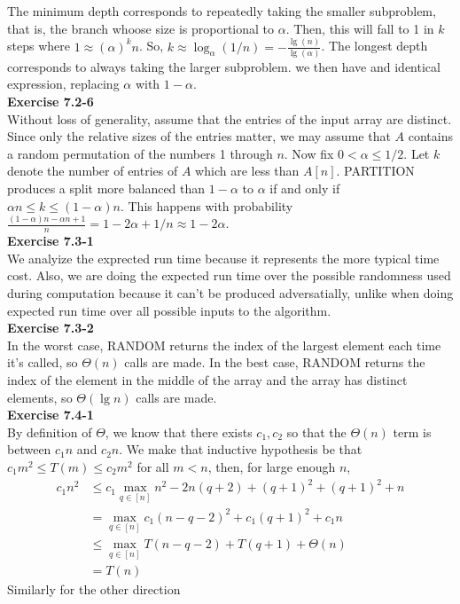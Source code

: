\documentclass{article}
\begin{document}
The minimum depth corresponds to repeatedly taking the smaller subproblem, that is, the branch whoose size is proportional to $\alpha$. Then, this will fall to 1 in $k$ steps where $1 \approx (\alpha)^k n$. So, $k \approx \log_{\alpha}(1/n) = - \frac{\lg(n)}{\lg(\alpha)} $. The longest depth corresponds to always taking the larger subproblem. we then have and identical expression, replacing $\alpha$ with $1-\alpha$.\\

\noindent\textbf{Exercise 7.2-6}\\

Without loss of generality, assume that the entries of the input array are distinct.  Since only the relative sizes of the entries matter, we may assume that $A$ contains a random permutation of the numbers 1 through $n$.  Now fix $0 < \alpha \leq 1/2$.  Let $k$ denote the number of entries of $A$ which are less than $A[n]$. PARTITION produces a split more balanced than $1-\alpha$ to $\alpha$ if and only if $\alpha n \leq k \leq (1-\alpha)n$.  This happens with probability $\frac{(1-\alpha)n - \alpha n + 1}{n} = 1-2\alpha + 1/n \approx 1 - 2\alpha$.\\

\noindent\textbf{Exercise 7.3-1}\\

We analyize the exprected run time because it represents the more typical time cost. Also, we are doing the expected run time over the possible randomness used during computation because it can't be produced adversatially, unlike when doing expected run time over all possible inputs to the algorithm.\\

\noindent\textbf{Exercise 7.3-2}\\

In the worst case, RANDOM returns the index of the largest element each time it's called, so $\Theta(n)$ calls are made.  In the best case, RANDOM returns the index of the element in the middle of the array and the array has distinct elements, so $\Theta(\lg n)$ calls are made. \\

\noindent\textbf{Exercise 7.4-1}\\

By definition of $\Theta$, we know that there exists $c_1,c_2$ so that the $\Theta(n)$ term is between $c_1 n$ and $c_2 n$. We make that inductive hypothesis be that $c_1 m^2 \le T(m) \le c_2 m^2$ for all $m < n$, then, for large enough $n$, 
\begin{align*}
c_1 n^2 &\le c_1 \max_{q\in [n]} n^2 -2 n(q+2) + (q+1)^2 +(q+1)^2 + n\\
& = \max_{q\in [n]} c_1 (n-q-2)^2 + c_1 (q+1)^2 +c_1 n\\
& \le \max_{q\in [n]} T( n-q-2) + T(q+1) + \Theta(n) \\
&= T(n)
\end{align*}
Similarly for the other direction
\\
\end{document}
